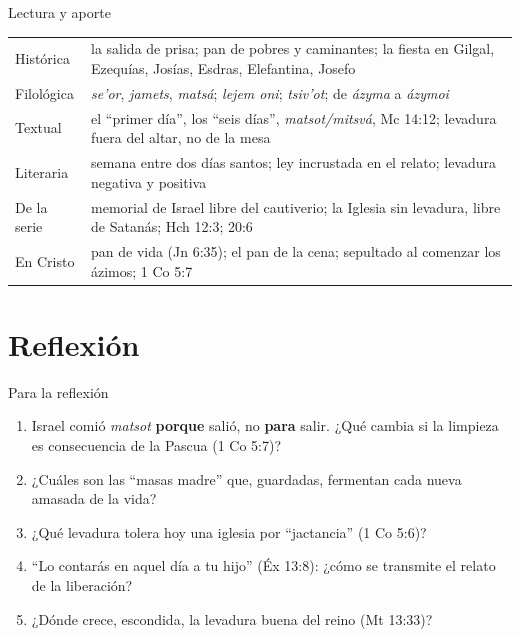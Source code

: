 \documentclass[hyperref={bookmarks=false},aspectratio=169]{beamer}
\newcommand{\destacar}[1]{\textbf{\textcolor{tierraroja}{#1}}}
\begin{document}
\begin{frame}{Lectura y aporte}
\scriptsize\renewcommand{\arraystretch}{1.13}
\begin{tabular}{@{}L{2.0cm}L{10.0cm}@{}}
\toprule
Histórica & la salida de prisa; pan de pobres y caminantes; la fiesta en Gilgal, Ezequías, Josías, Esdras, Elefantina, Josefo \\
Filológica & \emph{se'or}, \emph{jamets}, \emph{matsá}; \emph{lejem oni}; \emph{tsiv'ot}; de \emph{ázyma} a \emph{ázymoi} \\
Textual & el ``primer día'', los ``seis días'', \emph{matsot/mitsvá}, Mc 14:12; levadura fuera del altar, no de la mesa \\
Literaria & semana entre dos días santos; ley incrustada en el relato; levadura negativa y positiva \\
De la serie & memorial de Israel libre del cautiverio; la Iglesia sin levadura, libre de Satanás; Hch 12:3; 20:6 \\
En Cristo & pan de vida (Jn 6:35); el pan de la cena; sepultado al comenzar los ázimos; 1 Co 5:7 \\
\bottomrule
\end{tabular}
\end{frame}

\section{Reflexión}

\begin{frame}{Para la reflexión}
\small
\begin{enumerate}
\item Israel comió \emph{matsot} \destacar{porque} salió, no \destacar{para} salir. ¿Qué cambia si la limpieza es consecuencia de la Pascua (1 Co 5:7)?
\item ¿Cuáles son las ``masas madre'' que, guardadas, fermentan cada nueva amasada de la vida?
\item ¿Qué levadura tolera hoy una iglesia por ``jactancia'' (1 Co 5:6)?
\item ``Lo contarás en aquel día a tu hijo'' (Éx 13:8): ¿cómo se transmite el relato de la liberación?
\item ¿Dónde crece, escondida, la levadura buena del reino (Mt 13:33)?
\end{enumerate}
\end{frame}

\end{document}
